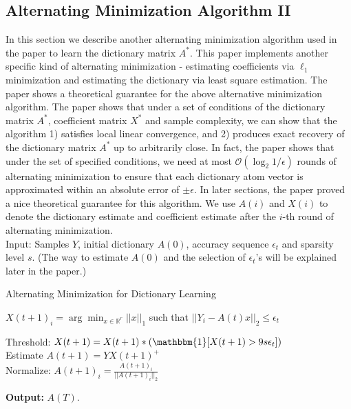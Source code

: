 \subsection{Alternating Minimization Algorithm II}
In this section we describe another alternating minimization algorithm used in the paper \cite{ref1} to learn the dictionary matrix $A^*$. This paper implements another specific kind of alternating minimization - estimating coefficients via $\ell_1$ minimization and estimating the dictionary via least square estimation. The paper shows a theoretical guarantee for the above alternative minimization algorithm. The paper shows that under a set of conditions of the dictionary matrix $A^*$, coefficient matrix $X^*$ and sample complexity, we can show that the algorithm 1) satisfies local linear convergence, and 2) produces exact recovery of the dictionary matrix $A^*$ up to arbitrarily close. In fact, the paper shows that under the set of specified conditions, we need at most $\mathcal{O}(\log_2 1/\epsilon)$ rounds of alternating minimization to ensure that each dictionary atom vector is approximated within an absolute error of $\pm \epsilon$. In later sections, the paper proved a nice theoretical guarantee for this algorithm. We use $A(i)$ and $X(i)$ to denote the dictionary estimate and coefficient estimate after the $i$-th round of alternating minimization.  \\

Input: Samples $Y$, initial dictionary $A(0)$, accuracy sequence $\epsilon_t$ and sparsity level $s$. (The way to estimate $A(0)$ and the selection of $\epsilon_t$'s will be explained later in the paper.)

\begin{algorithm}

\begin{algorithmic}
\caption{Alternating Minimization for Dictionary Learning}



$X(t+1)_i = \arg \min_{x \in \mathbb{R}^r}||x||_1$ such that $||Y_i - A(t)x||_2 \leq \epsilon_t$\\

\ENDFOR

Threshold: $X(t+1) = X(t+1) * (\mathbbm{1}[X(t+1) > 9s\epsilon_t])$\\

Estimate $A(t+1) = YX(t+1)^+$\\

Normalize: $A(t+1)_i = \frac{A(t+1)_i}{||A(t+1)_i||_2}$\\

\ENDFOR

\textbf{Output:} $A(T)$.
\end{algorithmic}
\end{algorithm}


